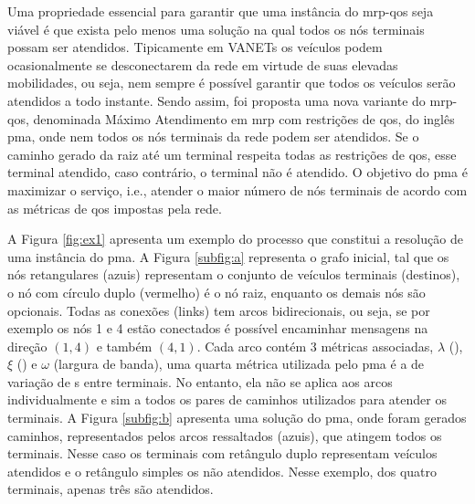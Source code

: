 Uma  propriedade   essencial  para  garantir  que   uma  instância  do
\gls{mrp-qos} seja viável é que exista  pelo menos uma solução na qual
todos os nós terminais possam ser atendidos.  Tipicamente em VANETs os
veículos podem ocasionalmente  se desconectarem da rede  em virtude de
suas elevadas mobilidades, ou seja, nem sempre é possível garantir que
todos os  veículos serão atendidos  a todo instante. Sendo  assim, foi
proposta  uma  nova  variante   do  \gls{mrp-qos},  denominada  Máximo
Atendimento  em  \gls{mrp}  com  restrições de  \gls{qos},  do  inglês
\gls{pma},  onde  nem  todos  os  nós  terminais  da  rede  podem  ser
atendidos. Se o caminho gerado da  raiz até um terminal respeita todas
as restrições de \gls{qos}, esse  terminal atendido, caso contrário, o
terminal  não é  atendido.   O  objetivo do  \gls{pma}  é maximizar  o
serviço, i.e., atender  o maior número de nós terminais  de acordo com
as métricas de \gls{qos} impostas pela rede.

A Figura \ref{fig:ex1} apresenta um  exemplo do processo que constitui
a resolução  de uma  instância do  \gls{pma}. A  Figura \ref{subfig:a}
representa  o  grafo inicial,  tal  que  os nós  retangulares  (azuis)
representam  o conjunto  de veículos  terminais (destinos),  o nó  com
círculo  duplo (vermelho)  é o  nó raiz,  enquanto os  demais nós  são
opcionais.   Todas as  conexões  (links) tem  arcos bidirecionais,  ou
seja,  se  por exemplo  os  nós  1 e  4  estão  conectados é  possível
encaminhar mensagens na direção $(1, 4)$ e também $(4, 1)$.  Cada arco
contém 3 métricas associadas,  $\lambda$ ({\delay}), $\xi$ ({\jitter})
e  $\omega$ (largura  de  banda), uma  quarta  métrica utilizada  pelo
\gls{pma} é a de variação de  {\delay s} entre terminais.  No entanto,
ela não se aplica aos arcos individualmente  e sim a todos os pares de
caminhos   utilizados   para   atender   os   terminais.    A   Figura
\ref{subfig:b} apresenta uma solução  do \gls{pma}, onde foram gerados
caminhos, representados  pelos arcos ressaltados (azuis),  que atingem
todos  os  terminais. Nesse  caso  os  terminais com  retângulo  duplo
representam  veículos   atendidos  e   o  retângulo  simples   os  não
atendidos.  Nesse  exemplo,  dos  quatro terminais,  apenas  três  são
atendidos.

